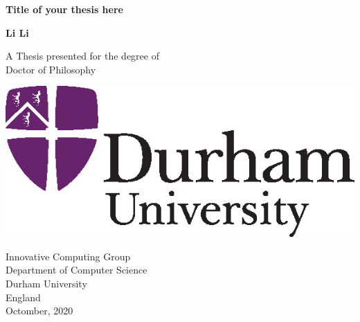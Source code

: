 
\newcommand{\thesisTitle}{Title of your thesis here}
\newcommand{\institute}{Department of Computer Science}
\newcommand{\authorLi}{Li Li}
\newcommand{\authorMail}{li.li4@durham.ac.uk}
\newcommand{\supervisor}{Prof. Toby Breckon, Dr Hubert P. H. Shum}
\newcommand{\resGroup}{Innovative Computing Group}
\newcommand{\monthAndYear}{Octomber, 2020}


\setcounter{page}{1}

\newpage

\thispagestyle{empty}
\begin{center}
  \vspace*{1cm}
  {\Huge \bf \thesisTitle}

  \vspace*{2cm}
  {\LARGE\bf \authorLi}

  \vfill

  {\Large A Thesis presented for the degree of\\
         [1mm] Doctor of Philosophy}
  \vspace*{0.9cm}
  
   \begin{center}
   \includegraphics{DU_2-col_sml.eps}
   \end{center}

  {\large \resGroup \\
          [-3mm] \institute \\
          [-3mm] Durham University \\
          [-3mm] England \\
          [1mm]  \monthAndYear }

\end{center}

